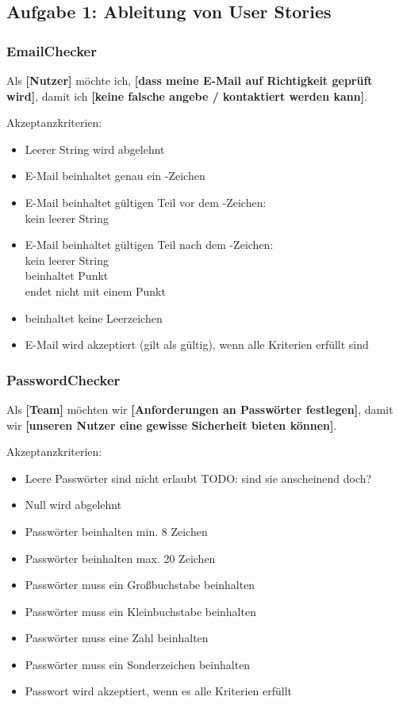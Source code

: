 \subsection*{Aufgabe 1: Ableitung von User Stories}

\subsubsection*{EmailChecker}
Als \textbf{[Nutzer]} möchte ich, \textbf{[dass meine E-Mail auf Richtigkeit geprüft wird]}, damit ich \textbf{[keine falsche angebe / kontaktiert werden kann]}.

Akzeptanzkriterien:
\begin{itemize}
    \item Leerer String wird abgelehnt
    \item E-Mail beinhaltet genau ein -Zeichen
    \item E-Mail beinhaltet gültigen Teil vor dem -Zeichen:
    \\kein leerer String
    \item E-Mail beinhaltet gültigen Teil nach dem -Zeichen:
    \\kein leerer String
    \\beinhaltet Punkt
    \\endet nicht mit einem Punkt
    \item beinhaltet keine Leerzeichen
    \item E-Mail wird akzeptiert (gilt als gültig), wenn alle Kriterien erfüllt sind
\end{itemize}

\subsubsection*{PasswordChecker}
Als \textbf{[Team]} möchten wir \textbf{[Anforderungen an Passwörter festlegen]}, damit wir \textbf{[unseren Nutzer eine gewisse Sicherheit bieten können]}.

Akzeptanzkriterien:
\begin{itemize}
    \item Leere Passwörter sind nicht erlaubt TODO: sind sie anscheinend doch?
    \item Null wird abgelehnt
    \item Passwörter beinhalten min. 8 Zeichen
    \item Passwörter beinhalten max. 20 Zeichen
    \item Passwörter muss ein Großbuchstabe beinhalten
    \item Passwörter muss ein Kleinbuchstabe beinhalten
    \item Passwörter muss eine Zahl beinhalten
    \item Passwörter muss ein Sonderzeichen beinhalten
    \item Passwort wird akzeptiert, wenn es alle Kriterien erfüllt
\end{itemize}

